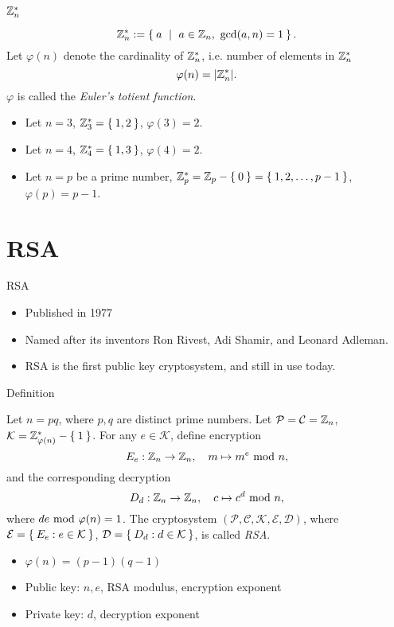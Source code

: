 \begin{frame}{${\mathbb Z}_n^*$}
\begin{definition}
\[
\ZZ_n^*:=\Set{a\ |\ a\in\ZZ_n,\ \gcd(a,n)=1}.
\]
Let $\varphi(n)$ denote the cardinality of ${\mathbb Z}_n^*$, i.e. number of elements in ${\mathbb Z}_n^*$
\[
\varphi(n)=\lvert {\mathbb Z}_n^*\rvert.
\]
$\varphi$ is called the \textit{Euler's totient function}.
\end{definition}
\begin{example}
    \begin{itemize}
        \item Let $n=3$, ${\mathbb Z}_3^*=\Set{1,2}$, $\varphi(3)=2$.
        \item Let $n=4$, ${\mathbb Z}_4^*=\Set{1,3}$, $\varphi(4)=2$.
        \item Let $n=p$ be a prime number, ${\mathbb Z}_p^*={\mathbb Z}_p-\Set{0}=\Set{1,2,\dots,p-1}$, $\varphi(p)=p-1$.
    \end{itemize}
    \end{example}
\end{frame}

\section{RSA}
\begin{frame}{\VideoName}
    \tableofcontents[currentsection]
\end{frame}

\begin{frame}{RSA}
    \begin{itemize}
        \item Published in 1977
        \item Named after its inventors Ron Rivest, Adi Shamir, and Leonard Adleman.
      \item RSA is the first public key cryptosystem, and still in use today.
    \end{itemize}
\end{frame}

\begin{frame}{Definition}
\begin{definition}[RSA]
Let $n=pq$, where $p,q$ are distinct prime numbers.
Let $\mathcal{P}=\mathcal{C}={\mathbb Z}_n$, $\mathcal{K}={\mathbb Z}_{\varphi(n)}^*-\Set{1}$.
For any $e\in \mathcal{K}$, define encryption
\[
    E_e:{\mathbb Z}_n\to{\mathbb Z}_n,\quad m\mapsto m^e\textrm{~mod~} n,
\]
and the corresponding decryption
\[
    D_d:{\mathbb Z}_n\to{\mathbb Z}_n,\quad c\mapsto c^d\textrm{~mod~} n,
\]
where $de\textrm{~mod~}\varphi(n)=1$.
The cryptosystem $(\mathcal{P},\mathcal{C},\mathcal{K},\mathcal{E},\mathcal{D})$, where $\mathcal{E}=\Set{E_e:e\in\mathcal{K}}$, $\mathcal{D}=\Set{D_d:d\in\mathcal{K}}$, is called \textit{RSA}.
\end{definition}
\begin{itemize}
    \item $\varphi(n)=(p-1)(q-1)$
    \item Public key: $n,e$, RSA modulus, encryption exponent
    \item Private key: $d$, decryption exponent
\end{itemize}
\end{frame}


